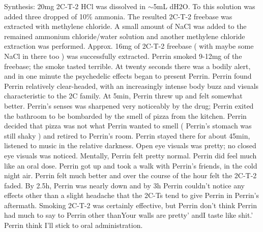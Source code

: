 \documentclass[12pt]{book}
\begin{document}
Synthesis: 20mg 2C-T-2 HCl was dissolved in $\sim$5mL dH2O. To this solution was added three dropped of 10\% ammonia. The resulted 2C-T-2 freebase was extracted with methylene chloride. A small amount of NaCl was added to the remained ammonium chloride/water solution and another methylene chloride extraction was performed. Approx. 16mg of 2C-T-2 freebase ( with maybe some NaCl in there too ) was successfully extracted. Perrin smoked 9-12mg of the freebase; the smoke tasted terrible. At twenty seconds there was a bodily alert, and in one minute the psychedelic effects began to present Perrin. Perrin found Perrin relatively clear-headed, with an increasingly intense body buzz and visuals characteristic to the 2C family. At 5min, Perrin threw up and felt somewhat better. Perrin's senses was sharpened very noticeably by the drug; Perrin exited the bathroom to be bombarded by the smell of pizza from the kitchen. Perrin decided that pizza was not what Perrin wanted to smell ( Perrin's stomach was still shaky ) and retired to Perrin's room. Perrin stayed there for about 45min, listened to music in the relative darkness. Open eye visuals was pretty; no closed eye visuals was noticed. Mentally, Perrin felt pretty normal. Perrin did feel much like an oral dose. Perrin got up and took a walk with Perrin's friends, in the cold night air. Perrin felt much better and over the course of the hour felt the 2C-T-2 faded. By 2.5h, Perrin was nearly down and by 3h Perrin couldn't notice any effects other than a slight headache that the 2C-Ts tend to give Perrin in Perrin's aftermath. Smoking 2C-T-2 was certainly effective, but Perrin don't think Perrin had much to say to Perrin other thanYour walls are pretty' andI taste like shit.' Perrin think I'll stick to oral administration.
\end{document}
